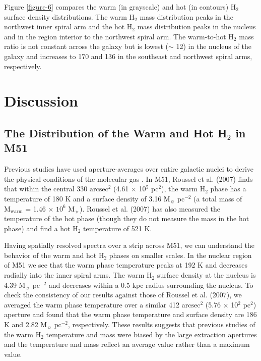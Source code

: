 \documentclass[manuscript]{aastex}
\begin{document}
Figure \ref{figure-6} compares the warm (in grayscale) 
and hot (in contours) H$_2$ surface density distributions.   
The warm $\mathrm{H_2}$ mass distribution peaks
in the northwest inner spiral arm and the hot H$_2$ 
mass distribution peaks in the nucleus and in the 
region interior to the northwest spiral arm.  The warm-to-hot 
$\mathrm{H_2}$ mass ratio is not constant across 
the galaxy but is lowest ($\sim$ 12) in the nucleus of the 
galaxy and increases to 170 and 136 in the southeast 
and northwest spiral arms, respectively.

\section{Discussion}

\subsection{The Distribution of the Warm and Hot H$_2$ in M51}

Previous studies have used aperture-averages over entire galactic
nuclei to derive the physical conditions of the molecular gas
\citep{rig02, hig06, rou07}.  In M51, Roussel et al. (2007) finds that within
the central 330 $\mathrm{arcsec^2}$ (4.61 $\times$ 10$^5$ pc$^2$),
the warm $\mathrm{H_2}$ phase has a temperature of 180 K and 
a surface density of 3.16 $\mathrm{M_\sun}$ $\mathrm{pc^{-2}}$ 
(a total mass of $\mathrm{M_{warm}}$ = 1.46 $\times$ $\mathrm{10^6}$
$\mathrm{M_\sun}$).  Roussel et al. (2007) has also measured the temperature of
the hot phase (though they do not measure the mass in the hot phase)
and find a hot $\mathrm{H_2}$ temperature of 521 K.

Having spatially resolved spectra over a strip across M51, we can 
understand the behavior of the warm and hot H$_2$ phases 
on smaller scales.  In the nuclear region of M51 we see that the 
warm phase temperature peaks at 192 K and decreases 
radially into the inner spiral arms.  The warm H$_2$ surface 
density at the nucleus is 4.39 $\mathrm{M_\sun}$ $\mathrm{pc^{-2}}$ 
and decreases within a 0.5 kpc radius surrounding the 
nucleus.  To check the consistency of 
our results against those of Roussel et al. (2007), we averaged the 
warm phase temperature over a similar 412 
$\mathrm{arcsec^2}$ (5.76 $\times$ 10$^2$ pc$^2$) aperture and
found that the warm phase temperature and surface density are
186 K and 2.82 $\mathrm{M_\sun}$ $\mathrm{pc^{-2}}$, 
respectively.  These results suggests that previous studies 
of the warm H$_2$ temperature and mass were 
biased by the large extraction apertures and the 
temperature and mass reflect an average 
value rather than a maximum value.
\end{document}
